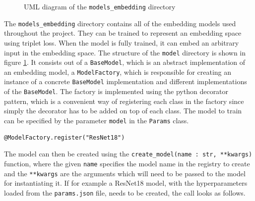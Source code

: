 \begin{figure}[ht]
{
    }
	\caption{UML diagram of the \texttt{models\_embedding} directory}
	\label{fig:UML-Models-Embedding}
\end{figure}
\noindent
The \texttt{models\_embedding} directory contains all of the embedding models used throughout the project. They can be trained to represent an embedding space using triplet loss. When the model is fully trained, it can embed an arbitrary input in the embedding space. The structure of the \texttt{model} directory is shown in figure \ref{fig:UML-Models-Embedding}. It consists out of a \texttt{BaseModel}, which is an abstract implementation of an embedding model, a \texttt{ModelFactory}, which is responsible for creating an instance of a concrete \texttt{BaseModel} implementation and different implementations of the \texttt{BaseModel}. The factory is implemented using the python decorator pattern, which is a convenient way of registering each class in the factory since simply the decorator has to be added on top of each class. The model to train can be specified by the parameter \texttt{model} in the \texttt{Params} class.

\begin{code}[htbp]
\begin{verbatim}
@ModelFactory.register("ResNet18")
\end{verbatim}
\caption{Registering a model in the model factory}
\label{code:Model-Factory}
\end{code}
\noindent
The model can then be created using the \texttt{create\_model(name : str, **kwargs)} function, where the given \texttt{name} specifies the model name in the registry to create and the \texttt{**kwargs} are the arguments which will need to be passed to the model for instantiating it. If for example a ResNet18 model, with the hyperparameters loaded from the \texttt{params.json} file, needs to be created, the call looks as follows.

